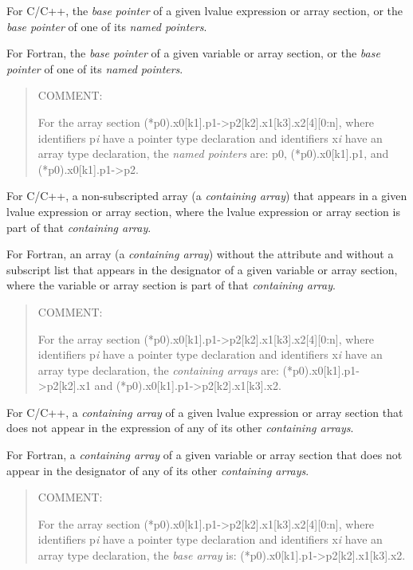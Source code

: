 \glossarydefstart
For C/C++, the \emph{base pointer} of a given lvalue expression or 
array section, or the \emph{base pointer} of one of its \emph{named pointers}.

For Fortran, the \emph{base pointer} of a given variable or array section, or
the \emph{base pointer} of one of its \emph{named pointers}.

\begin{quote}
COMMENT: 

For the array section
(*p0).x0[k1].p1->p2[k2].x1[k3].x2[4][0:n],
where identifiers p\emph{i} have a pointer type declaration
and identifiers x\emph{i} have an array type declaration, the 
\emph{named pointers} are: 
p0, 
(*p0).x0[k1].p1,
and 
(*p0).x0[k1].p1->p2.
\end{quote}
\glossarydefend

\glossarydefstart
For C/C++, a non-subscripted array (a \emph{containing array}) that appears in
a given lvalue expression or array section, where the lvalue expression or
array section is part of that \emph{containing array}.

For Fortran, an array (a \emph{containing array}) without the 
attribute and without a subscript list that appears in the designator of a
given variable or array section, where the variable or array section is part
of that \emph{containing array}.

\begin{quote}
COMMENT: 

For the array section
(*p0).x0[k1].p1->p2[k2].x1[k3].x2[4][0:n],
where identifiers p\emph{i} have a pointer type declaration
and identifiers x\emph{i} have an array type declaration, 
the \emph{containing arrays} are:
    (*p0).x0[k1].p1->p2[k2].x1
and 
(*p0).x0[k1].p1->p2[k2].x1[k3].x2.
\end{quote}
\glossarydefend

\glossarydefstart
For C/C++, a \emph{containing array} of a given lvalue expression or 
array section that does not appear in the expression of any of its 
other \emph{containing arrays}.

For Fortran, a \emph{containing array} of a given variable or array section
that does not appear in the designator of any of its other 
\emph{containing arrays}.

\begin{quote}
COMMENT: 

For the array section
(*p0).x0[k1].p1->p2[k2].x1[k3].x2[4][0:n],
where identifiers p\emph{i} have a pointer type declaration
and identifiers x\emph{i} have an array type declaration, 
the \emph{base array} is: (*p0).x0[k1].p1->p2[k2].x1[k3].x2.
\end{quote}
\glossarydefend

